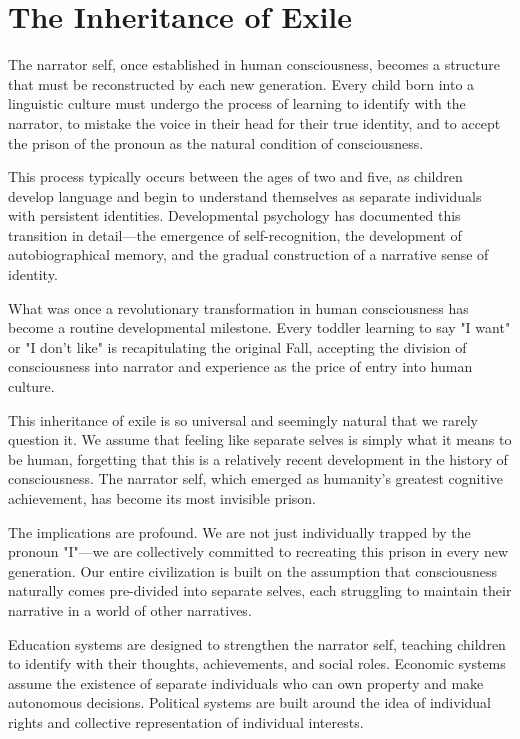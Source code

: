 \section{The Inheritance of Exile}

The narrator self, once established in human consciousness, becomes a structure that must be reconstructed by each new generation. Every child born into a linguistic culture must undergo the process of learning to identify with the narrator, to mistake the voice in their head for their true identity, and to accept the prison of the pronoun as the natural condition of consciousness.

This process typically occurs between the ages of two and five, as children develop language and begin to understand themselves as separate individuals with persistent identities. Developmental psychology has documented this transition in detail—the emergence of self-recognition, the development of autobiographical memory, and the gradual construction of a narrative sense of identity.

What was once a revolutionary transformation in human consciousness has become a routine developmental milestone. Every toddler learning to say "I want" or "I don't like" is recapitulating the original Fall, accepting the division of consciousness into narrator and experience as the price of entry into human culture.

This inheritance of exile is so universal and seemingly natural that we rarely question it. We assume that feeling like separate selves is simply what it means to be human, forgetting that this is a relatively recent development in the history of consciousness. The narrator self, which emerged as humanity's greatest cognitive achievement, has become its most invisible prison.

The implications are profound. We are not just individually trapped by the pronoun "I"—we are collectively committed to recreating this prison in every new generation. Our entire civilization is built on the assumption that consciousness naturally comes pre-divided into separate selves, each struggling to maintain their narrative in a world of other narratives.

Education systems are designed to strengthen the narrator self, teaching children to identify with their thoughts, achievements, and social roles. Economic systems assume the existence of separate individuals who can own property and make autonomous decisions. Political systems are built around the idea of individual rights and collective representation of individual interests.

